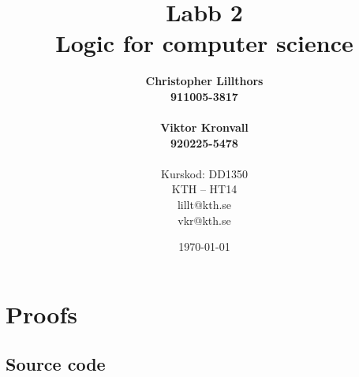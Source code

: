 \documentclass[a4paper,11pt]{article}
\title{Labb 2 \\ Logic for computer science}
\author{
  {\bf Christopher Lillthors}\\
  \textbf{911005-3817} \\\\
  {\bf Viktor Kronvall}\\
  \textbf{920225-5478}\\
  \\
  Kurskod: DD1350\\
  KTH -- HT14\\
  lillt@kth.se\\
  vkr@kth.se
}
\date{\today}
\begin{document}
\maketitle
\thispagestyle{empty}
\begin{abstract}

\end{abstract}
\renewcommand{\arraystretch}{1.2}
\newpage
\thispagestyle{empty}
\tableofcontents
\newpage
\clearpage
\setcounter{page}{1}
\section{Proofs}

\newpage
\begin{appendices}
\section{Source code}

\end{appendices}
\end{document}
